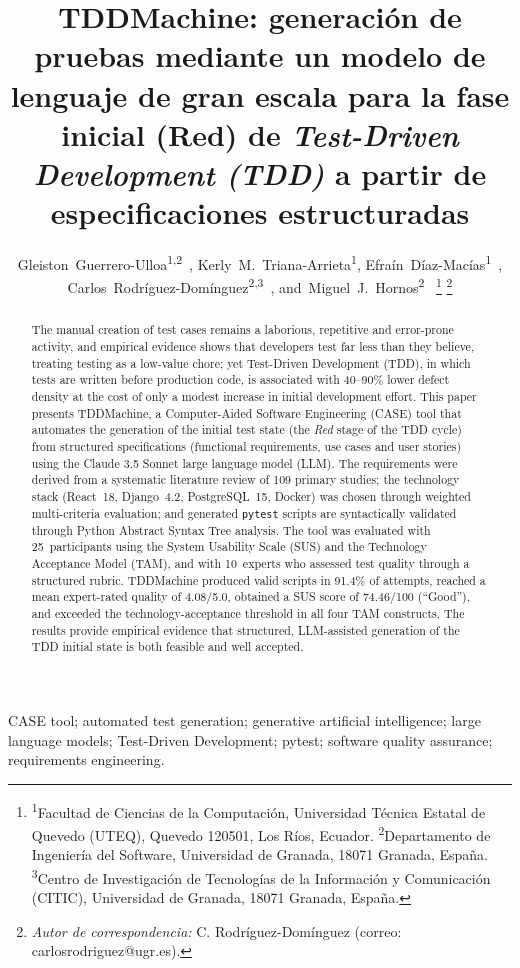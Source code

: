 \documentclass[10pt,journal,twoside,letterpaper]{IEEEtran}
\author{%
    Gleiston~Guerrero-Ulloa\textsuperscript{1,2}~\orcidlink{0000-0001-5990-2357},
    Kerly~M.~Triana-Arrieta\textsuperscript{1},
    Efraín~Díaz-Macías\textsuperscript{1}~\orcidlink{0000-0003-4087-029X},
    Carlos~Rodríguez-Domínguez\textsuperscript{2,3}~\orcidlink{0000-0001-5626-3115},
    and~Miguel~J.~Hornos\textsuperscript{2}~\orcidlink{0000-0001-5722-9816}%
    \thanks{\textsuperscript{1}Facultad de Ciencias de la Computación, Universidad Técnica Estatal de Quevedo (UTEQ), Quevedo 120501, Los Ríos, Ecuador. \textsuperscript{2}Departamento de Ingeniería del Software, Universidad de Granada, 18071 Granada, España. \textsuperscript{3}Centro de Investigación de Tecnologías de la Información y Comunicación (CITIC), Universidad de Granada, 18071 Granada, España.}%
    \thanks{\emph{Autor de correspondencia:} C. Rodríguez-Domínguez (correo: carlosrodriguez@ugr.es).}%
}
\begin{document}
    
    \IEEEoverridecommandlockouts
    
    \title{TDDMachine: generación de pruebas mediante un modelo de lenguaje de gran escala para la fase inicial (Red) de \textit{Test-Driven Development (TDD)} a partir de especificaciones estructuradas}
    
    \maketitle
    \thispagestyle{enfoqueutefirstpage}
    
    \begin{abstract}
        The manual creation of test cases remains a laborious, repetitive and error-prone activity, and empirical evidence shows that developers test far less than they believe, treating testing as a low-value chore; yet Test-Driven Development (TDD), in which tests are written before production code, is associated with 40--90\% lower defect density at the cost of only a modest increase in initial development effort. This paper presents TDDMachine, a Computer-Aided Software Engineering (CASE) tool that automates the generation of the initial test state (the \emph{Red} stage of the TDD cycle) from structured specifications (functional requirements, use cases and user stories) using the Claude 3.5 Sonnet large language model (LLM). The requirements were derived from a systematic literature review of 109 primary studies; the technology stack (React~18, Django~4.2, PostgreSQL~15, Docker) was chosen through weighted multi-criteria evaluation; and generated \texttt{pytest} scripts are syntactically validated through Python Abstract Syntax Tree analysis. The tool was evaluated with 25~participants using the System Usability Scale (SUS) and the Technology Acceptance Model (TAM), and with 10~experts who assessed test quality through a structured rubric. TDDMachine produced valid scripts in 91.4\% of attempts, reached a mean expert-rated quality of 4.08/5.0, obtained a SUS score of 74.46/100 (``Good''), and exceeded the technology-acceptance threshold in all four TAM constructs. The results provide empirical evidence that structured, LLM-assisted generation of the TDD initial state is both feasible and well accepted.
    \end{abstract}
    
    \begin{IEEEkeywords}
        CASE tool; automated test generation; generative artificial intelligence; large language models; Test-Driven Development; pytest; software quality assurance; requirements engineering.
    \end{IEEEkeywords}
    
\end{document}
